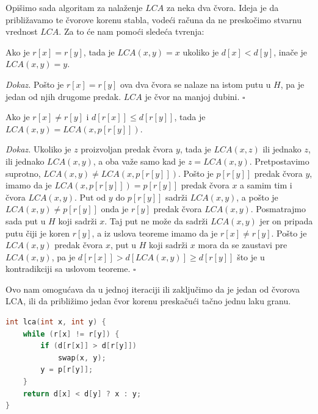 Opi\v simo sada algoritam za nala\v zenje $LCA$ za neka dva \v cvora. Ideja je da pribli\v zavamo te \v cvorove korenu stabla, vode\' ci ra\v cuna da ne presko\v cimo stvarnu vrednost $LCA$. Za to \' ce nam pomo\' ci slede\' ca tvr\dj enja:

\begin{thm}
Ako je $r[x] = r[y]$, tada je $LCA(x,y) = x$ ukoliko je $d[x] < d[y]$, ina\v ce je $LCA(x, y) = y$.
\end{thm}

\textit{Dokaz.} Po\v sto je $r[x] = r[y]$ ova dva \v cvora se nalaze na istom putu u $H$, pa je jedan od njih drugome predak. $LCA$ je \v cvor na manjoj dubini. \hfill $\square$

\begin{thm}
Ako je $r[x] \not = r[y]$ i $d[r[x]] \leq d[r[y]]$, tada je $LCA(x,y) = LCA(x, p[r[y]])$.
\end{thm}

\textit{Dokaz.} Ukoliko je $z$ proizvoljan predak \v cvora $y$, tada je $LCA(x,z)$ ili jednako $z$, ili jednako $LCA(x,y)$, a oba va\v ze samo kad je $z=LCA(x,y)$.  Pretpostavimo suprotno, $LCA(x,y) \not = LCA(x, p[r[y]])$.  Po\v sto je $p[r[y]]$ predak \v cvora $y$, imamo da je $LCA(x, p[r[y]]) = p[r[y]]$ predak \v cvora $x$ a samim tim i \v cvora $LCA(x,y)$. Put od $y$ do $p[r[y]]$ sadr\v zi $LCA(x,y)$, a po\v sto je $LCA(x,y) \not = p[r[y]]$ onda je $r[y]$ predak \v cvora $LCA(x,y)$. Posmatrajmo sada put u $H$ koji sadr\v zi $x$. Taj put ne mo\v ze da sadr\v zi $LCA(x,y)$ jer on pripada putu \v ciji je koren $r[y]$, a iz uslova teoreme imamo da je $r[x] \not = r[y]$. Po\v sto je $LCA(x,y)$ predak \v cvora $x$, put u $H$ koji sadr\v zi $x$ mora da se zaustavi pre $LCA(x,y)$, pa je $d[r[x]] > d[LCA(x,y)] \geq d[r[y]]$ \v sto je u kontradikciji sa uslovom teoreme. \hfill $\square$

Ovo nam omogu\' cava da u jednoj iteraciji ili zaklju\v cimo da je jedan od \v cvorova LCA, ili da pribli\v zimo jedan \v cvor korenu preska\v cu\' ci ta\v cno jednu laku granu.

\noindent
\begin{minipage}{\textwidth}
\begin{lstlisting}[language=C++, title={Implementacija algoritma za nala\v zenje LCA:}, style=customcpp]
int lca(int x, int y) {
	while (r[x] != r[y]) {
		if (d[r[x]] > d[r[y]])
			swap(x, y);
		y = p[r[y]];
	}
	return d[x] < d[y] ? x : y;
}
\end{lstlisting}
\end{minipage}

